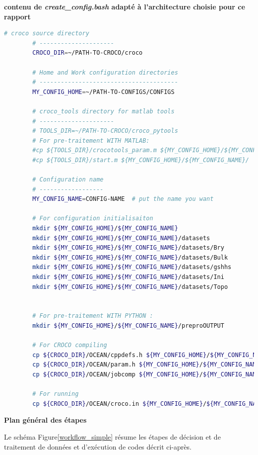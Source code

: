 \documentclass[10pt,a4paper,titlepage]{article}
\begin{document}
\begin{codeEnv}{\textbf{contenu de \textit{create\_config.bash} adapté à l’architecture choisie pour ce rapport}}\label{create_config}
    \begin{lstlisting}[language=bash]
        # croco source directory
        # ---------------------
        CROCO_DIR=~/PATH-TO-CROCO/croco

        # Home and Work configuration directories
        # ---------------------------------------
        MY_CONFIG_HOME=~/PATH-TO-CONFIGS/CONFIGS

        # croco_tools directory for matlab tools
        # ---------------------
        # TOOLS_DIR=~/PATH-TO-CROCO/croco_pytools
        # For pre-traitement WITH MATLAB:
        #cp ${TOOLS_DIR}/crocotools_param.m ${MY_CONFIG_HOME}/${MY_CONFIG_NAME}/
        #cp ${TOOLS_DIR}/start.m ${MY_CONFIG_HOME}/${MY_CONFIG_NAME}/

        # Configuration name
        # ------------------
        MY_CONFIG_NAME=CONFIG-NAME  # put the name you want

        # For configuration initialisaiton
        mkdir ${MY_CONFIG_HOME}/${MY_CONFIG_NAME}
        mkdir ${MY_CONFIG_HOME}/${MY_CONFIG_NAME}/datasets
        mkdir ${MY_CONFIG_HOME}/${MY_CONFIG_NAME}/datasets/Bry
        mkdir ${MY_CONFIG_HOME}/${MY_CONFIG_NAME}/datasets/Bulk
        mkdir ${MY_CONFIG_HOME}/${MY_CONFIG_NAME}/datasets/gshhs
        mkdir ${MY_CONFIG_HOME}/${MY_CONFIG_NAME}/datasets/Ini
        mkdir ${MY_CONFIG_HOME}/${MY_CONFIG_NAME}/datasets/Topo


        # For pre-traitement WITH PYTHON :
        mkdir ${MY_CONFIG_HOME}/${MY_CONFIG_NAME}/preproOUTPUT

        # For CROCO compiling
        cp ${CROCO_DIR}/OCEAN/cppdefs.h ${MY_CONFIG_HOME}/${MY_CONFIG_NAME}/
        cp ${CROCO_DIR}/OCEAN/param.h ${MY_CONFIG_HOME}/${MY_CONFIG_NAME}/
        cp ${CROCO_DIR}/OCEAN/jobcomp ${MY_CONFIG_HOME}/${MY_CONFIG_NAME}/

        # For running
        cp ${CROCO_DIR}/OCEAN/croco.in ${MY_CONFIG_HOME}/${MY_CONFIG_NAME}/

    \end{lstlisting}
\end{codeEnv}

\textbf{Plan général des étapes}



Le schéma Figure\ref{workflow_simple} résume les étapes de décision et de traitement de données et d'exécution de codes décrit ci-après.
\end{document}
